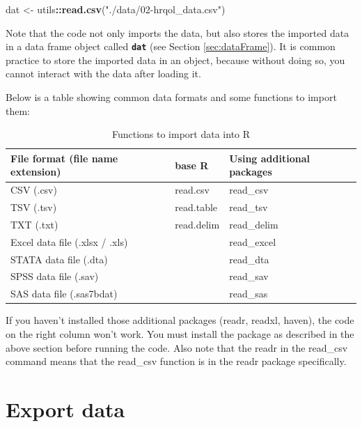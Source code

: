 \documentclass[
]{book}
\newenvironment{Shaded}{\begin{snugshade}}{\end{snugshade}}
\newcommand{\FunctionTok}[1]{\textcolor[rgb]{0.13,0.29,0.53}{\textbf{#1}}}
\newcommand{\NormalTok}[1]{#1}
\newcommand{\OtherTok}[1]{\textcolor[rgb]{0.56,0.35,0.01}{#1}}
\newcommand{\SpecialCharTok}[1]{\textcolor[rgb]{0.81,0.36,0.00}{\textbf{#1}}}
\newcommand{\StringTok}[1]{\textcolor[rgb]{0.31,0.60,0.02}{#1}}
\begin{document}
\begin{Shaded}
\begin{Highlighting}[]
\NormalTok{dat }\OtherTok{\textless{}{-}}\NormalTok{ utils}\SpecialCharTok{::}\FunctionTok{read.csv}\NormalTok{(}\StringTok{"./data/02{-}hrqol\_data.csv"}\NormalTok{)}
\end{Highlighting}
\end{Shaded}

Note that the code not only imports the data, but also stores the imported data in a data frame object called \textbf{\texttt{dat}} (see Section \ref{sec:dataFrame}). It is common practice to store the imported data in an object, because without doing so, you cannot interact with the data after loading it.

Below is a table showing common data formats and some functions to import them:

\begin{table}

\caption{\label{tab:data-import}Functions to import data into R}
\centering
\begin{tabular}[t]{l|l|l}
\hline
File format (file name extension) & base R & Using additional packages\\
\hline
CSV (.csv) & read.csv & read\_csv\\
\hline
TSV (.tsv) & read.table & read\_tsv\\
\hline
TXT (.txt) & read.delim & read\_delim\\
\hline
Excel data file (.xlsx / .xls) &  & read\_excel\\
\hline
STATA data file (.dta) &  & read\_dta\\
\hline
SPSS data file (.sav) &  & read\_sav\\
\hline
SAS data file (.sas7bdat) &  & read\_sas\\
\hline
\end{tabular}
\end{table}

If you haven't installed those additional packages (readr, readxl, haven), the code on the right column won't work. You must install the package as described in the above section before running the code. Also note that the readr in the read\_csv command means that the read\_csv function is in the readr package specifically.

\section{Export data}\label{export-data}
\end{document}
